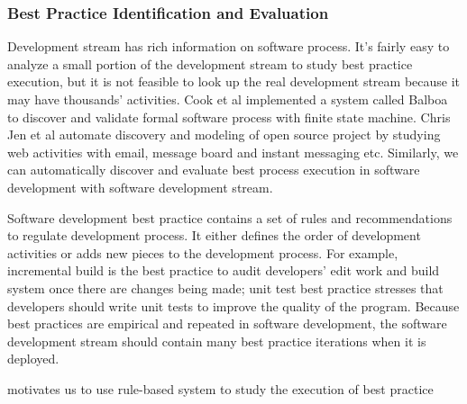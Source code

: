 \subsubsection{Best Practice Identification and Evaluation}
Development stream has rich information on software process. It's fairly easy to analyze 
a small portion of the development stream to study best practice execution, but it is
not feasible to look up the real development stream because it may have thousands' 
activities. Cook et al \cite{Cook:95} implemented a system called Balboa to discover 
and validate formal software process with finite state machine. Chris Jen et al automate 
discovery and modeling of open source project by studying web activities with email, message 
board and instant messaging etc\cite{Jesen:02}. Similarly, we can automatically discover
and evaluate best process execution in software development with software development 
stream.

Software development best practice contains a set of rules and recommendations to regulate
development process. It either defines the order of development activities or adds new
pieces to the development process. For example, incremental build is the best practice to
audit developers' edit work and build system once there are changes being made; unit test 
best practice stresses that developers should write unit tests to improve the quality of the 
program. Because best practices are empirical and repeated in software development, the software
development stream should contain many best practice iterations when it is deployed. 


 motivates us to use rule-based system
to study the execution of best practice


